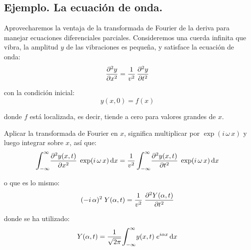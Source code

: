 \subsection*{Ejemplo. La ecuación de onda.}

Aprovecharemos la ventaja de la transformada de Fourier de la deriva para manejar ecuaciones diferenciales parciales. Consideremos una cuerda infinita que vibra, la amplitud $y$ de las vibraciones es pequeña, y satisface la ecuación de onda:
\begin{equation}
\pdv[2]{y}{x} = \dfrac{1}{v^{2}} \, \pdv[2]{y}{t}
\label{eq:ecuacion_15_42}
\end{equation}

con la condición inicial:
\begin{equation}
y(x, 0) = f(x)
\label{eq:ecuacion_15_43}
\end{equation}

donde $f$ está localizada, es decir, tiende a cero para valores grandes de $x$.
\par
Aplicar la transformada de Fourier en $x$, significa multiplicar por $\exp(i \, \omega \, x)$ y luego integrar sobre $x$, así que:
\begin{align}
\scaleint{6ex}_{\bs -\infty}^{\infty} \pdv[2]{y(x, t)}{x} \; \exp(i \, \omega \, x) \dd{x} = \dfrac{1}{v^{2}} \, \scaleint{6ex}_{\bs -\infty}^{\infty} \pdv[2]{y (x, t)}{t} \; \exp(i \, \omega \, x) \dd{x}
\label{eq:ecuacion_15_44}
\end{align}

o que es lo mismo:
\begin{equation}
(-i \, \alpha)^{2} \; Y(\alpha, t) = \dfrac{1}{v^{2}} \; \pdv[2]{Y(\alpha, t)}{t}
\label{eq:ecuacion_15_45}
\end{equation}

donde se ha utilizado:
\begin{equation}
Y(\alpha, t) = \dfrac{1}{\sqrt{2 \pi}} \scaleint{6ex}_{\bs -\infty}^{\infty} y(x, t) \; e^{i \alpha x} \, \dd x
\label{eq:ecuacion_15_46}
\end{equation}

